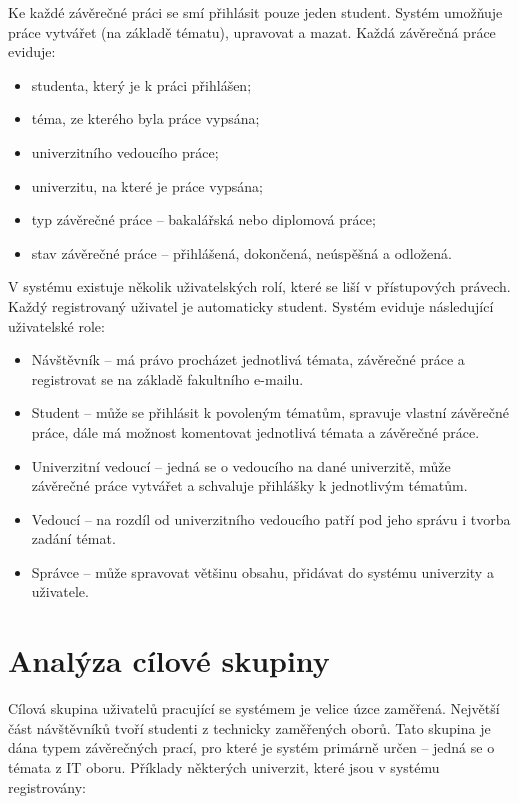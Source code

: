 Ke každé závěrečné práci se smí přihlásit pouze jeden student. Systém umožňuje práce vytvářet (na základě tématu), upravovat a mazat. Každá závěrečná práce eviduje:

\begin{itemize}
    \item studenta, který je k práci přihlášen;
    \item téma, ze kterého byla práce vypsána;
    \item univerzitního vedoucího práce;
    \item univerzitu, na které je práce vypsána;
    \item typ závěrečné práce -- bakalářská nebo diplomová práce;
    \item stav závěrečné práce -- přihlášená, dokončená, neúspěšná a odložená.
\end{itemize}

V systému existuje několik uživatelských rolí, které se liší v přístupových právech. Každý registrovaný uživatel je automaticky student. Systém eviduje následující uživatelské role:

\begin{itemize}
    \item Návštěvník -- má právo procházet jednotlivá témata, závěrečné práce a registrovat se na základě fakultního e-mailu.
    \item Student -- může se přihlásit k povoleným tématům, spravuje vlastní závěrečné práce, dále má možnost komentovat jednotlivá témata a závěrečné práce.
    \item Univerzitní vedoucí -- jedná se o vedoucího na dané univerzitě, může závěrečné práce vytvářet a schvaluje přihlášky k jednotlivým tématům.
    \item Vedoucí -- na rozdíl od univerzitního vedoucího patří pod jeho správu i tvorba zadání témat.
    \item Správce -- může spravovat většinu obsahu, přidávat do systému univerzity a uživatele.
\end{itemize}

\section{Analýza cílové skupiny}

Cílová skupina uživatelů pracující se systémem je velice úzce zaměřená. Největší část návštěvníků tvoří studenti z technicky zaměřených oborů. Tato skupina je dána typem závěrečných prací, pro které je systém primárně určen -- jedná se o témata z IT oboru. Příklady některých univerzit, které jsou v systému registrovány:

